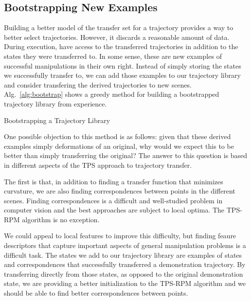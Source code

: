 \subsection{Bootstrapping New Examples}
Building a better model of the transfer set for a trajectory provides a way
to better select trajectories. However, it discards a reasonable amount of
data. During execution, have access to the transferred trajectories in addition
to the states they were transferred to. In some sense, these are new examples of 
successful manipulations in their own right. Instead of simply storing
the states we successfully transfer to, we can add those examples to our trajectory 
library and consider transfering the derived trajectories to new scenes. 
Alg.~\ref{alg:bootstrap} shows a greedy method for building a bootstrapped trajectory
library from experience.

\begin{algorithm}
        
 \caption{Bootstrapping a Trajectory Library}
 \label{alg:bootstrap}
\end{algorithm}

One possible objection to this method is as follows: given that these derived examples
simply deformations of an original, why would we expect this to be better than simply
transferring the original? The answer to this question is based in different
aspects of the TPS approach to trajectory transfer.

The first is that, in addition to finding a transfer function that minimizes curvature,
we are also finding correspondences between points in the different scenes. Finding 
correspondences is a difficult and well-studied problem in computer vision and the best
approaches are subject to local optima. The TPS-RPM algorithm is no exception. 

We could appeal to local features to improve this difficulty, but finding feaure descriptors 
that capture important aspects of general manipulation problems is a difficult task. The
states we add to our trajectory library are examples of states and correspondences that 
successfully transferred a demonstration trajectory. By transferring directly from those
states, as opposed to the original demonstration state, we are providing a better 
initialization to the TPS-RPM algorithm and we should be able to find better correspondences
between points.

